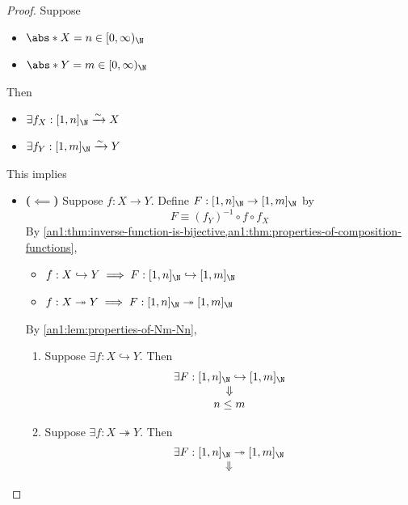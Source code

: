 \begin{proof}
  Suppose
  \begin{itemize}
    \item $\abs*{X} = n \in [0, \infty)_{\N}$
    \item $\abs*{Y} = m \in [0, \infty)_{\N}$
  \end{itemize}
  Then
  \begin{itemize}
    \item $\exists f_{X}: [1, n]_{\N} \xrightarrow{\sim} X$
    \item $\exists f_{Y}: [1, m]_{\N} \xrightarrow{\sim} Y$
  \end{itemize}
  This implies
  \begin{itemize}
    \item \textbf{($\impliedby$)} Suppose $f: X \to Y$. Define $F: [1, n]_{\N} \to [1, m]_{\N}$ by
          \[
            F \equiv (f_{Y})^{-1} \circ f \circ f_{X}
          \]
          By \cref{an1:thm:inverse-function-is-bijective,an1:thm:properties-of-composition-functions},
          \begin{itemize}
            \item $f: X \hookrightarrow Y \implies F: [1, n]_{\N} \hookrightarrow [1, m]_{\N}$
            \item $f: X \twoheadrightarrow Y \implies F: [1, n]_{\N} \twoheadrightarrow [1, m]_{\N}$
          \end{itemize}
          By \cref{an1:lem:properties-of-Nm-Nn},
          \begin{enumerate}[label=\textbf{(\Alph*)}]
            \item Suppose $\exists f: X \hookrightarrow Y$. Then
                  \[
                    \begin{array}{c}
                      \exists F: [1, n]_{\N} \hookrightarrow [1, m]_{\N} \\
                      \Downarrow                                         \\
                      n \leq m
                    \end{array}
                  \]
            \item Suppose $\exists f: X \twoheadrightarrow Y$. Then
                  \[
                    \begin{array}{c}
                      \exists F: [1, n]_{\N} \twoheadrightarrow [1, m]_{\N} \\
                      \Downarrow                                            \\

\end{array}\]
\end{enumerate}
\end{itemize}
\end{proof}
